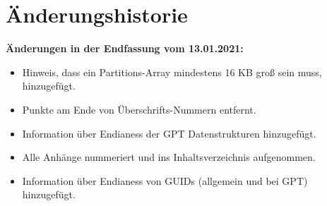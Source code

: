 \section{Änderungshistorie}

\textbf{Änderungen in der Endfassung vom 13.01.2021:}

\begin{itemize}
    \item Hinweis, dass ein Partitions-Array mindestens 16 KB groß sein muss, hinzugefügt.

    \item Punkte am Ende von Überschrifts-Nummern entfernt.

    \item Information über Endianess der GPT Datenstrukturen hinzugefügt.
    
    \item Alle Anhänge nummeriert und ins Inhaltsverzeichnis aufgenommen.
    
    \item Information über Endianess von GUIDs (allgemein und bei GPT) hinzugefügt.
\end{itemize}
